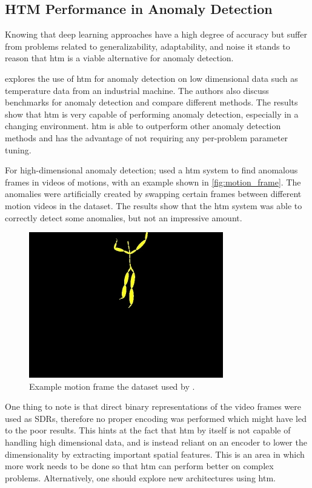 \subsection{HTM Performance in Anomaly Detection}
\label{sec:htm_perf}
Knowing that deep learning approaches have a high degree of accuracy but suffer from problems related to generalizability, adaptability, and noise it stands to reason that \gls*{htm} is a viable alternative for anomaly detection.\par
\textcite{AHMAD2017134} explores the use of \gls*{htm} for anomaly detection on low dimensional data such as temperature data from an industrial machine. The authors also discuss benchmarks for anomaly detection and compare different methods. The results show that \gls*{htm} is very capable of performing anomaly detection, especially in a changing environment. \gls*{htm} is able to outperform other anomaly detection methods and has the advantage of not requiring any per-problem parameter tuning.
\par
For high-dimensional anomaly detection; \textcite{MotionAnomalyDetection} used a \gls*{htm} system to find anomalous frames in videos of motions, with an example shown in \autoref{fig:motion_frame}. The anomalies were artificially created by swapping certain frames between different motion videos in the dataset. The results show that the \gls*{htm} system was able to correctly detect some anomalies, but not an impressive amount.
\begin{figure}[htb]
    \centering
    \includegraphics[width=0.5\linewidth]{resources/related_works/motion_frame.png}
    \caption[Example Motion Frame]{Example motion frame the dataset used by \textcite{MotionAnomalyDetection}.}
    \label{fig:motion_frame}
\end{figure}
\par
One thing to note is that direct binary representations of the video frames were used as SDRs, therefore no proper encoding was performed which might have led to the poor results. This hints at the fact that \gls*{htm} by itself is not capable of handling high dimensional data, and is instead reliant on an encoder to lower the dimensionality by extracting important spatial features. This is an area in which more work needs to be done so that \gls*{htm} can perform better on complex problems. Alternatively, one should explore new architectures using \gls*{htm}.
